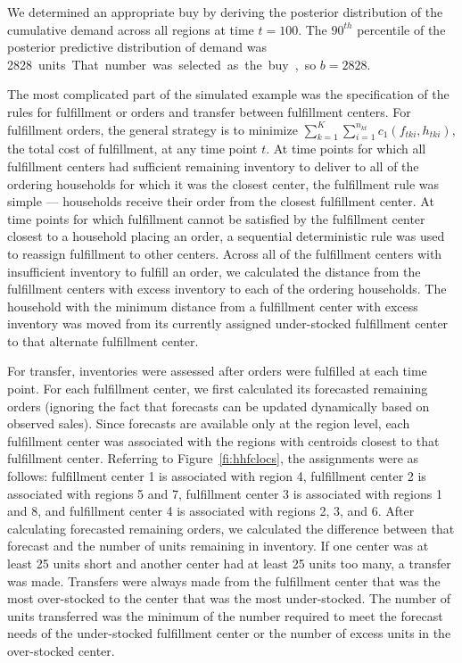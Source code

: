 \documentclass[11pt, oneside]{article}   	%
\begin{document}
We determined an appropriate buy by deriving the posterior distribution of the cumulative demand across all regions at time $t = 100$.  The $90^{th}$ percentile of the posterior predictive distribution of demand was \SI{2828} units.  That number was selected as the buy, so $b = 2828$.

The most complicated part of the simulated example was the specification of the rules for fulfillment or orders and transfer between fulfillment centers.  For fulfillment orders, the general strategy is to minimize $\sum_{k = 1}^K \sum_{i = 1}^{n_{kt}} c_1 (f_{tki}, h_{tki})$, the total cost of fulfillment, at any time point $t$.  At time points for which all fulfillment centers had sufficient remaining inventory to deliver to all of the ordering households for which it was the closest center, the fulfillment rule was simple --- households receive their order from the closest fulfillment center.  At time points for which fulfillment cannot be satisfied by the fulfillment center closest to a household placing an order, a sequential deterministic rule was used to reassign fulfillment to other centers.  Across all of the fulfillment centers with insufficient inventory to fulfill an order, we calculated the distance from the fulfillment centers with excess inventory to each of the ordering households.  The household with the minimum distance from a fulfillment center with excess inventory was moved from its currently assigned under-stocked fulfillment center to that alternate fulfillment center.

For transfer, inventories were assessed after orders were fulfilled at each time point.  For each fulfillment center, we first calculated its forecasted remaining orders (ignoring the fact that forecasts can be updated dynamically based on observed sales).  Since forecasts are available only at the region level, each fulfillment center was associated with the regions with centroids closest to that fulfillment center.  Referring to Figure~\ref{fi:hhfclocs}, the assignments were as follows: fulfillment center 1 is associated with region 4, fulfillment center 2 is associated with regions 5 and 7, fulfillment center 3 is associated with regions 1 and 8, and fulfillment center 4 is associated with regions 2, 3, and 6.  After calculating forecasted remaining orders, we calculated the difference between that forecast and the number of units remaining in inventory.  If one center was at least 25 units short and another center had at least 25 units too many, a transfer was made.  Transfers were always made from the fulfillment center that was the most over-stocked to the center that was the most under-stocked.  The number of units transferred was the minimum of the number required to meet the forecast needs of the under-stocked fulfillment center or the number of excess units in the over-stocked center.
\end{document}
